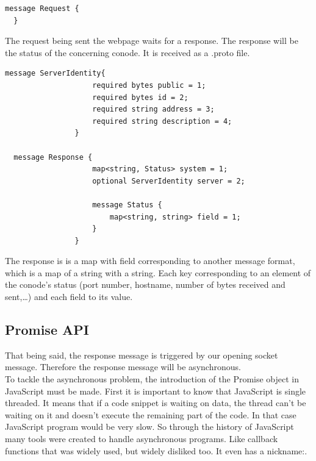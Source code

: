\documentclass[11pt, a4paper, twoside, openright, openany]{book} %
\begin{document}
\begin{lstlisting}[caption={empty .proto file}, captionpos=b]
  message Request {
  }
\end{lstlisting}

\fi

The request being sent the webpage waits for a response. The response will be the
status of the concerning conode. It is received as a .proto file.

\begin{lstlisting}[caption={response .proto file}, captionpos=b]
  message ServerIdentity{
    				required bytes public = 1;
    				required bytes id = 2;
    				required string address = 3;
    				required string description = 4;
				}

  message Response {
    				map<string, Status> system = 1;
    				optional ServerIdentity server = 2;

				    message Status {
        				map<string, string> field = 1;
    				}
				}
\end{lstlisting}

The response is is a map with field corresponding to another message format, which
is a map of a string with a string. Each key corresponding to an element of the conode's
status (port number, hostname, number of bytes received and sent,\ldots) and each field
to its value.\\
\subsection{Promise API}
That being said, the response message is triggered by our opening socket message. Therefore the
response message will be asynchronous.\\
To tackle the asynchronous problem, the introduction of the Promise object in JavaScript must be
made. First it is important to know that JavaScript is single threaded. It means
that if a code snippet is waiting on data, the thread can't be waiting on it and doesn't execute
the remaining part of the code. In that case JavaScript program would be very slow.
So through the history of JavaScript many tools were created to handle asynchronous programs.
Like callback functions that was widely used, but widely disliked too. It even has a nickname:.\\
\end{document}
